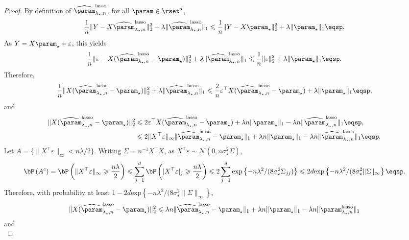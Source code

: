 \begin{proof}
By definition of $\widehat\param^{\mathrm{lasso}}_{\lambda_\star,n}$, for all $\param\in\rset^d$,
$$
\frac{1}{n}\|Y - X\widehat\param^{\mathrm{lasso}}_{\lambda_\star,n}\|_2^2 + \lambda\|\widehat\param^{\mathrm{lasso}}_{\lambda_\star,n}\|_1 \leqslant \frac{1}{n}\|Y - X\param_\star\|_2^2 + \lambda\|\param_\star\|_1\eqsp.
$$
As $Y = X\param_\star + \varepsilon$, this yields
$$
\frac{1}{n}\|\varepsilon - X(\widehat\param^{\mathrm{lasso}}_{\lambda_\star,n}-\param_\star)\|_2^2 + \lambda\|\widehat\param^{\mathrm{lasso}}_{\lambda_\star,n}\|_1 \leqslant \frac{1}{n}\|\varepsilon\|_2^2 + \lambda\|\param_\star\|_1\eqsp.
$$
Therefore,
$$
\frac{1}{n}\|X(\widehat\param^{\mathrm{lasso}}_{\lambda_\star,n}-\param_\star)\|_2^2 + \lambda\|\widehat\param^{\mathrm{lasso}}_{\lambda_\star,n}\|_1 \leqslant \frac{2}{n}\varepsilon^\top X(\widehat\param^{\mathrm{lasso}}_{\lambda_\star,n}-\param_\star) + \lambda\|\param_\star\|_1\eqsp.
$$
and
\begin{align}
\|X(\widehat\param^{\mathrm{lasso}}_{\lambda_\star,n}-\param_\star)\|_2^2  &\leqslant 2\varepsilon^\top X(\widehat\param^{\mathrm{lasso}}_{\lambda_\star,n}-\param_\star) + \lambda n \|\param_\star\|_1 - \lambda n \|\widehat\param^{\mathrm{lasso}}_{\lambda_\star,n}\|_1\eqsp,\label{eq:lasso:general:bound}\\
&\leqslant 2 \|X^\top \varepsilon\|_\infty \|\widehat\param^{\mathrm{lasso}}_{\lambda_\star,n}-\param_\star\|_1   + \lambda n \|\param_\star\|_1 - \lambda n \|\widehat\param^{\mathrm{lasso}}_{\lambda_\star,n}\|_1\eqsp.\nonumber
\end{align}
Let $A = \{\|X^\top\varepsilon\|_\infty < n\lambda / 2\}$. Writing $\Sigma = n^{-1}X^\top X$, as  $X^\top\varepsilon\sim \mathcal{N}(0,n\sigma_\star^2 \Sigma)$,
$$
\bP\left(A^c\right) = \bP\left(\|X^\top\varepsilon\|_\infty \geqslant \frac{n\lambda}{2}\right) \leqslant \sum_{j=1}^{d} \bP\left(|X^\top\varepsilon|_j \geqslant \frac{n\lambda}{2}\right) \leqslant 2\sum_{j=1}^{d}\mathrm{exp}\left\{-n\lambda^2/(8\sigma_\star^2  \Sigma_{jj})\right\} \leqslant 2 d\mathrm{exp}\left\{-n\lambda^2/(8\sigma_\star^2  \|\Sigma\|_\infty\right\}\eqsp.
$$
Therefore, with probability at least $1 - 2 d\mathrm{exp}\left\{-n\lambda^2/(8\sigma_\star^2  \|\Sigma\|_\infty\right\}$,
$$
\|X(\widehat\param^{\mathrm{lasso}}_{\lambda_\star,n}-\param_\star)\|_2^2  \leqslant  \lambda n  \|\widehat\param^{\mathrm{lasso}}_{\lambda_\star,n}-\param_\star\|_1   + \lambda n \|\param_\star\|_1 - \lambda n \|\param^{\mathrm{lasso}}_{\lambda_\star,n}\|_1
$$
and
$$
$$
\end{proof}
